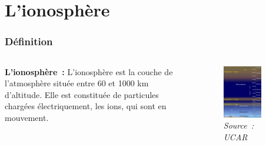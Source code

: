 \documentclass[xcolor=dvipsnames,envcountsect]{beamer}
\begin{document}
\section{L'ionosphère}
\begin{frame}
	\frametitle{Définition}
	\begin{columns}
	    \justifying
		\begin{column}{0.5\textwidth}
	    	\textbf{L'ionosphère :} 
			L'ionosphère est la couche de l'atmosphère située entre 60 et 1000 km d'altitude.
			Elle est constituée de particules chargées électriquement, les ions, qui sont en mouvement.
		\end{column}
		\begin{column}{0.5\textwidth}
			\begin{figure}
				\centering
				\includegraphics[width=0.7\textwidth]{./Figures/iono_ucar.png}
				\caption {\textit{Source : UCAR}}	
			\end{figure}
		\end{column}	
	\end{columns}
\end{frame}
\end{document}
